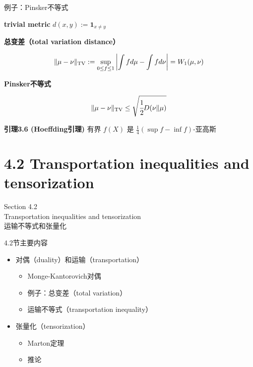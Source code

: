 \documentclass{beamer}
\begin{document}
\begin{frame}{例子：Pinsker不等式}

\textbf{trivial metric} $d(x, y) := \mathbf{1}_{x\neq y}$

\textbf{总变差（total variation distance）}

$$
\|\mu-\nu\|_{\rm TV} := \sup_{0\le f\le 1} \left|\int fd\mu - \int fd\nu\right| = W_1(\mu, \nu)
$$

\textbf{Pinsker不等式}

$$
\|\mu-\nu\|_{\rm TV} \le \sqrt{\cfrac{1}{2}D(\nu\|\mu)}
$$

\textbf{引理3.6 (Hoeffding引理)} 有界 $f(X)$ 是 $\frac{1}{4}(\sup f - \inf f)$-亚高斯
    
\end{frame}

\section{4.2 Transportation inequalities and tensorization}

\begin{frame}
\begin{center}
\Large Section 4.2 \\ Transportation inequalities and tensorization \\ 运输不等式和张量化
\end{center}
\end{frame}

\begin{frame}{4.2节主要内容}

\begin{itemize}
    \item 对偶（duality）和运输（transportation）
    \begin{itemize}
        \item Monge-Kantorovich对偶
        \item 例子：总变差（total variation）
        \item 运输不等式（transportation inequality）
    \end{itemize}
    
    \item 张量化（tensorization）
    \begin{itemize}
        \item Marton定理
        \item 推论
    \end{itemize}
\end{itemize}

\end{frame}
\end{document}
